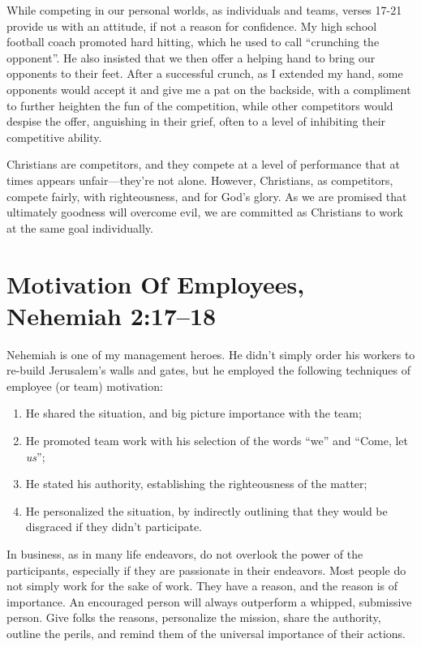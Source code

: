\documentclass[12pt]{memoir}
\begin{document}
While competing in our personal worlds, as individuals and teams,
verses 17-21 provide us with an attitude, if not a reason for confidence.
My high school football coach promoted hard hitting, which he used
to call ``crunching the opponent''. He also insisted that we then
offer a helping hand to bring our opponents to their feet. After a
successful crunch, as I extended my hand, some opponents would
accept it and give me a pat on the backside, with a compliment to
further heighten the fun of the competition, while other competitors
would despise the offer, anguishing in their grief, often to a level
of inhibiting their competitive ability.

Christians are competitors, and they compete at a level of performance that at times appears unfair---they're not alone. However, Christians, as competitors, compete fairly, with righteousness, and for God's glory. As we are promised that ultimately goodness will overcome evil, we are committed as Christians to work at the same goal individually.

\section[Motivation Of Employees]{Motivation Of Employees, Nehemiah 2:17--18}


Nehemiah is one of my management heroes. He didn't simply order
his workers to re-build Jerusalem's walls and gates, but he employed
the following techniques of employee (or team) motivation: 
\begin{enumerate}
\item He shared the situation, and big picture importance with the team; 
\item He promoted team work with his selection of the words ``we'' and ``Come, let \emph{us}''; 
\item He stated his authority, establishing the righteousness of the matter; 
\item He personalized the situation, by indirectly outlining that they would be disgraced if they didn't participate. 
\end{enumerate}
In business, as in many life endeavors, do not overlook the power
of the participants, especially if they are passionate in their endeavors.
Most people do not simply work for the sake of work. They have a reason, and the reason is of importance. An encouraged person will always outperform a whipped, submissive person. Give folks the
reasons, personalize the mission, share the authority, outline the perils, and remind them of the universal importance of their actions.
\end{document}
